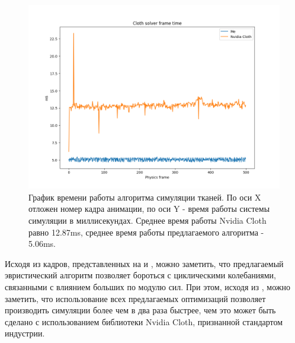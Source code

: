 	\begin{figure}[ht!] 
		\center
		\includegraphics [scale=0.7] {my_folder/images//frameTimePlot}	
		\caption{График времени работы алгоритма симуляции тканей. По оси X отложен номер кадра анимации, по оси Y - время работы системы симуляции в миллисекундах. Среднее время работы Nvidia Cloth равно 12.87ms, среднее время работы предлагаемого алгоритма - 5.06ms. } 
		\label{fig:solversPlot}
	\end{figure}
	\FloatBarrier
	
	Исходя из кадров, представленных на  и , можно заметить, что предлагаемый эвристический алгоритм позволяет бороться с циклическими колебаниями, связанными с влиянием больших по модулю сил. При этом, исходя из , можно заметить, что использование всех предлагаемых оптимизаций позволяет производить симуляции более чем в два раза быстрее, чем это может быть сделано с использованием библиотеки Nvidia Cloth, признанной стандартом индустрии.
	
	


